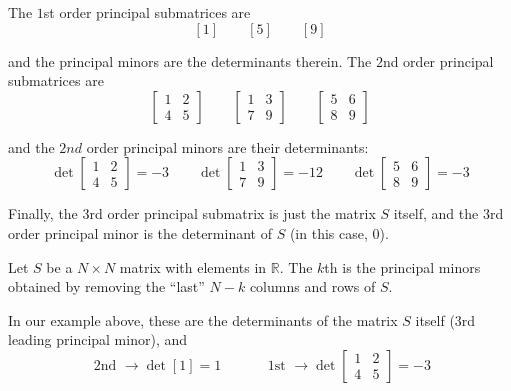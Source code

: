 \documentclass{article}
\begin{document}
The $1$st order principal submatrices are
\[
  [1]
  \quad\quad
  [5]
  \quad\quad
  [9]
\]

and the principal minors are the determinants therein. The $2$nd order principal submatrices are
\[
  \left[\begin{matrix}
    1 & 2 \\
    4 & 5
  \end{matrix}\right]
  \quad\quad
  \left[\begin{matrix}
    1 & 3 \\
    7 & 9
  \end{matrix}\right]
  \quad\quad
  \left[\begin{matrix}
    5 & 6 \\
    8 & 9
  \end{matrix}\right]
\]

and the $2nd$ order principal minors are their  determinants:
\[
  \det\left[\begin{matrix}
    1 & 2 \\
    4 & 5
  \end{matrix}\right]
  = -3
  \quad\quad
  \det\left[\begin{matrix}
    1 & 3 \\
    7 & 9
  \end{matrix}\right]
  = -12
  \quad\quad
  \det\left[\begin{matrix}
    5 & 6 \\
    8 & 9
  \end{matrix}\right]
  =
  -3
\]

Finally, the $3$rd order principal submatrix is just the matrix $S$ itself, and the $3$rd order principal minor is the determinant of $S$ (in this case, $0$).

\begin{definition}
  Let $S$ be a $N \times N$ matrix with elements in $\mathbb{R}$. The $k$th  is the principal minors obtained by removing the ``last'' $N - k$ columns and rows of $S$.
\end{definition}

In our example above, these are the determinants of the matrix $S$ itself ($3$rd leading principal minor), and
\[
  \text{ 2nd }
  \rightarrow
  \det[1]
  =
  1
  \quad\quad\quad
  \text{ 1st }
  \rightarrow
  \det\left[\begin{matrix}
    1 & 2 \\
    4 & 5
  \end{matrix}\right]
  =
  - 3
\]
\end{document}
